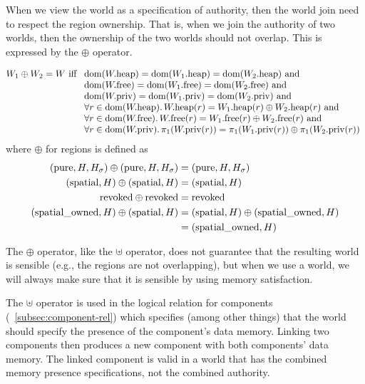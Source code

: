 \begin{jversion}
When we view the world as a specification of authority, then the world join need to respect the region ownership.
That is, when we join the authority of two worlds, then the ownership of the two worlds should not overlap.
This is expressed by the $\oplus$ operator.
\begin{definition}
  \[
    W_1 \oplus W_2 = W
  \text{ iff }
  \begin{array}[t]{l}
    \dom(\pwheap) = \dom(\pwheap[W_1]) = \dom(\pwheap[W_2]) \tand \\
    \dom(\pwfree) = \dom(\pwfree[W_1]) = \dom(\pwfree[W_2]) \tand \\
    \dom(\pwpriv) = \dom(\pwpriv[W_1]) = \dom(\pwpriv[W_2]) \tand \\
    \forall r \in \dom(\pwheap) \ldotp \pwheap(r) = \pwheap[W_1](r) \oplus \pwheap[W_2](r) \tand \\
    \forall r \in \dom(\pwfree) \ldotp \pwfree(r) = \pwfree[W_1](r) \oplus \pwfree[W_2](r) \tand \\
    \forall r \in \dom(\pwpriv) \ldotp \pi_1(\pwpriv(r)) = \pi_1(\pwpriv[W_1](r)) \oplus \pi_1(\pwpriv[W_2](r))
  \end{array}
  \]
  where $\oplus$ for regions is defined as
\begin{align*}
  (\pure,H,H_\sigma) \oplus (\pure,H,H_\sigma) =  & \; (\pure,H,H_\sigma) \\
  (\spatial,H) \oplus (\spatial,H) =  & \; (\spatial,H) \\
  \revoked \oplus \revoked = & \; \revoked \\
  (\spatialo,H) \oplus (\spatial,H) = & \; (\spatial,H) \oplus (\spatialo,H)\\
                                           =  & \; (\spatialo,H)
\end{align*}
\end{definition}
The $\oplus$ operator, like the $\uplus$ operator, does not guarantee that the resulting world is sensible (e.g., the regions are not overlapping), but when we use a world, we will always make sure that it is sensible by using memory satisfaction.

The $\uplus$ operator is used in the logical relation for components (\sectionname~\ref{subsec:component-rel}) which specifies (among other things) that the world should specify the presence of the component's data memory.
Linking two components then produces a new component with both components' data memory.
The linked component is valid in a world that has the combined memory presence specifications, not the combined authority.


\end{jversion}
